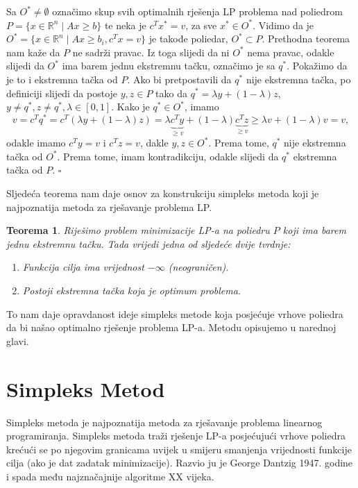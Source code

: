 \documentclass[a4paper, utf8, 11pt, colorlinks]{article}
\newtheorem{thm}{Teorema}
\newenvironment{proof}{{Dokaz:}}{\hfill$\square$}
\begin{document}
\begin{proof}
         Sa $O^* \not = \emptyset$ označimo skup svih optimalnih rješenja LP problema nad poliedrom $P= \{ x \in \mathbb{R}^n \mid A x \geq b \}$ te neka je $c^T x^* = v$, za sve $x^* \in O^*$. Vidimo da je 
         $O^* = \{ x \in \mathbb{R}^n \mid A x \geq b_i, c^T x = v  \}$ je takođe poliedar, $O^* \subset P$. Prethodna teorema nam kaže da $P$ ne sadrži pravac. Iz toga slijedi da ni $O^*$ nema pravac, odakle slijedi da $O^*$ ima barem jednu ekstremnu tačku, označimo je sa $q^*$. Pokažimo da je to i ekstremna tačka od $P$.  Ako bi pretpostavili da $q^*$ nije ekstremna tačka, po definiciji slijedi da postoje $y, z \in P$ tako da $q^* = \lambda y + ( 1 - \lambda ) z $, $y \neq q^*, z \neq q^*, \lambda \in [0, 1]$. Kako je $q^* \in O^*$, imamo 
         $$ v = c^T q^* = c^T (  \lambda y + ( 1 - \lambda ) z ) = \lambda 
        \underbrace{ c^T y}_{ \geq v} + ( 1 - \lambda ) \underbrace{c^T z}_{\geq v} \geq \lambda v + (1 - \lambda) v = v,$$
        odakle imamo $c^T y = v$ i $c^T z = v$, dakle $y, z \in O^*$. Prema tome, $q^*$ nije ekstremna tačka od $O^*$. Prema tome, imam kontradikciju, odakle slijedi da $q^*$  ekstremna tačka od  $P$.
\end{proof}
 
 Sljedeća teorema nam daje osnov za konstrukciju simpleks metoda koji je najpoznatija metoda za rješavanje problema LP.
 
 \begin{thm}
   Riješimo problem minimizacije LP-a na poliedru $P$ koji ima barem jednu ekstremnu tačku. Tada vrijedi jedna od sljedeće dvije tvrdnje:
   \begin{enumerate}
       \item Funkcija cilja ima vrijednost $- \infty$ (neograničen).
       \item Postoji ekstremna tačka koja je optimum problema. 
   \end{enumerate}
 \end{thm}
To nam daje opravdanost ideje simpleks metode koja posjećuje vrhove poliedra 
da bi našao optimalno rješenje problema LP-a. Metodu opisujemo u narednoj glavi.

\newpage 
\section{Simpleks Metod}

Simpleks metoda je najpoznatija metoda za rješavanje problema linearnog programiranja. Simpleks metoda traži rješenje LP-a posjećujući vrhove poliedra krećući se po njegovim granicama  uvijek u smijeru smanjenja vrijednosti
funkcije cilja (ako je dat zadatak minimizacije). Razvio ju je George Dantzig 1947. godine i spada među najznačajnije algoritme XX vijeka.
\end{document}
